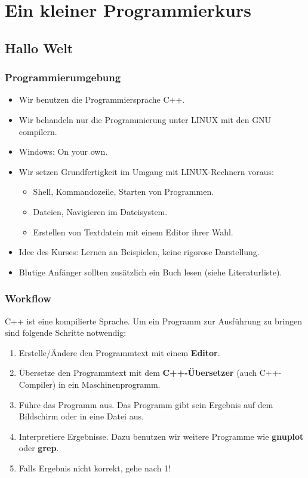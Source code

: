 \section{Ein kleiner Programmierkurs}


\subsection{Hallo Welt}

\begin{frame}[fragile]
\frametitle{Programmierumgebung}
\begin{itemize}
\item Wir benutzen die Programmiersprache C++.
\item Wir behandeln nur die Programmierung unter LINUX mit den GNU
  compilern.
\item Windows: On your own.
\item Wir setzen Grundfertigkeit im Umgang mit LINUX-Rechnern voraus:
\begin{itemize}
\item Shell, Kommandozeile, Starten von Programmen.
\item Dateien, Navigieren im Dateisystem.
\item Erstellen von Textdatein mit einem Editor ihrer Wahl.
\end{itemize}
\item Idee des Kurses: \glqq{}Lernen an Beispielen\grqq{}, keine
  rigorose Darstellung.
\item Blutige Anfänger sollten zusätzlich ein Buch lesen (siehe Literaturliste).
\end{itemize}
\end{frame}

\begin{frame}[fragile]
\frametitle{Workflow}
C++ ist eine \glqq{}kompilierte\grqq{} Sprache. Um ein Programm zur
Ausführung zu bringen sind folgende Schritte notwendig:
\begin{enumerate}
\item Erstelle/Ändere den Programmtext mit einem \textbf{Editor}.
\item Übersetze den Programmtext mit dem \textbf{C++-Übersetzer}
  (auch C++-Compiler) in ein Maschinenprogramm.
\item Führe das Programm aus. Das Programm gibt sein Ergebnis auf dem
  Bildschirm oder in eine Datei aus.
\item Interpretiere Ergebnisse. Dazu benutzen wir weitere Programme
  wie \textbf{gnuplot} oder \textbf{grep}.
\item Falls Ergebnis nicht korrekt, gehe nach 1!
\end{enumerate}
\end{frame}

